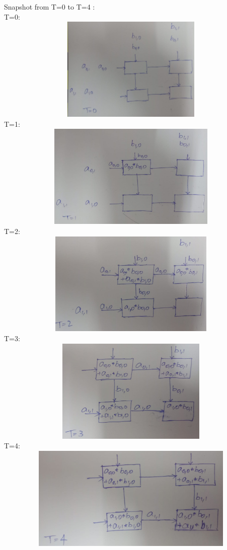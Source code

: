 \documentclass[letterpaper]{article}
\begin{document}
\begin{large}
\begin{flushleft}
\begin{enumerate}
Snapshot from T=0 to T=4 :\\[0.1in]
T=0:
\includegraphics[width = 15cm,height = 5cm]{T=0}\\[0.1in]
T=1:
\includegraphics[width = 15cm,height = 5cm]{T=1}\\[0.1in]
T=2:
\includegraphics[width = 15cm,height = 5cm]{T=2}\\[0.1in]
T=3:
\includegraphics[width = 15cm,height = 5cm]{T=3}\\[0.1in]
T=4:
\includegraphics[width = 15cm,height = 5cm]{T=4}\\[0.1in]

\end{enumerate}
\end{flushleft}
\end{large}
\end{document}
